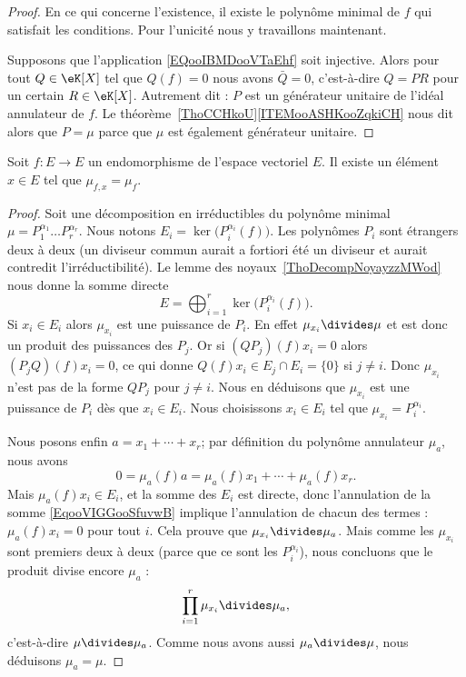 \begin{proof}
	En ce qui concerne l'existence, il existe le polynôme minimal de \( f\) qui satisfait les conditions. Pour l'unicité nous y travaillons maintenant.

	Supposons que l'application \eqref{EQooIBMDooVTaEhf} soit injective. Alors pour tout \( Q\in \eK[X]\) tel que \( Q(f)=0\) nous avons \( \bar Q=0\), c'est-à-dire \( Q=PR\) pour un certain \( R\in \eK[X]\). Autrement dit : \( P\) est un générateur unitaire de l'idéal annulateur de \( f\). Le théorème~\ref{ThoCCHkoU}\ref{ITEMooASHKooZqkiCH} nous dit alors que \( P=\mu\) parce que \( \mu\) est également générateur unitaire.
\end{proof}

\begin{lemma}\label{LemSYsJJj}
	Soit \( f\colon E\to E\) un endomorphisme de l'espace vectoriel \( E\). Il existe un élément \( x\in E\) tel que \( \mu_{f,x}=\mu_f\).
\end{lemma}

\begin{proof}
	Soit une décomposition en irréductibles du polynôme minimal \( \mu=P_1^{\alpha_1}\ldots P_r^{\alpha_r}\). Nous notons \( E_i=\ker\big( P_i^{\alpha_i}(f) \big)\). Les polynômes \( P_i\) sont étrangers deux à deux (un diviseur commun aurait a fortiori été un diviseur et aurait contredit l'irréductibilité). Le lemme des noyaux~\ref{ThoDecompNoyayzzMWod} nous donne la somme directe
	\begin{equation}
		E=\bigoplus_{i=1}^r\ker\big( P_i^{\alpha_i}(f) \big).
	\end{equation}
	Si \( x_i\in E_i\) alors \( \mu_{x_i}\) est une puissance de \( P_i\). En effet \( \mu_{x_i}\divides \mu\) et est donc un produit des puissances des \( P_j\). Or si \( (QP_j)(f)x_i=0\) alors \( (P_jQ)(f)x_i=0\), ce qui donne \( Q(f)x_i\in E_j\cap E_i=\{ 0 \}\) si \( j\neq i\). Donc \( \mu_{x_i}\) n'est pas de la forme \( QP_j\) pour \( j\neq i\). Nous en déduisons que \( \mu_{x_i}\) est une puissance de \( P_i\) dès que \( x_i\in E_i\). Nous choisissons \( x_i\in E_i\) tel que \( \mu_{x_i}=P_i^{\alpha_i}\).

	Nous posons enfin \( a=x_1+\cdots +x_r\); par définition du polynôme annulateur \( \mu_a\), nous avons
	\begin{equation}        \label{EqooVIGGooSfuvwB}
		0=\mu_a(f)a=\mu_a(f)x_1+\cdots +\mu_a(f)x_r.
	\end{equation}
	Mais \( \mu_a(f)x_i\in E_i\), et la somme des \( E_i\) est directe, donc l'annulation de la somme \eqref{EqooVIGGooSfuvwB} implique l'annulation de chacun des termes : \( \mu_a(f)x_i=0\) pour tout \( i\). Cela prouve que \( \mu_{x_i}\divides \mu_a\). Mais comme les \( \mu_{x_i}\) sont premiers deux à deux (parce que ce sont les \( P_i^{\alpha_i}\)), nous concluons que le produit divise encore \( \mu_a\) :
	\begin{equation}
		\prod_{i=1}^r\mu_{x_i}\divides \mu_a,
	\end{equation}
	c'est-à-dire \( \mu\divides \mu_a\). Comme nous avons aussi \( \mu_a\divides \mu\), nous déduisons \( \mu_a=\mu\).
\end{proof}

